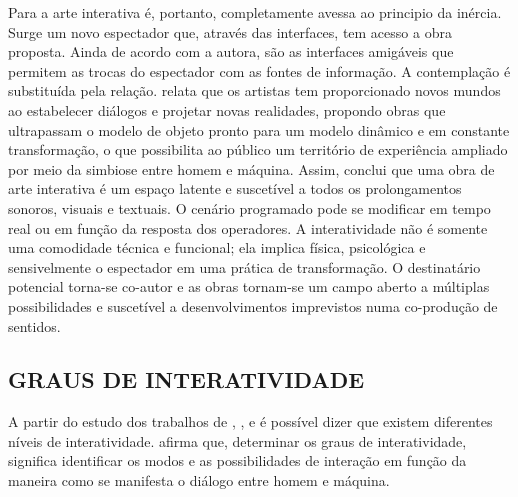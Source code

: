 Para  a arte interativa é, portanto, completamente avessa ao principio da inércia. Surge um novo espectador que, através das interfaces, tem acesso a obra proposta. Ainda de acordo com a autora, são as interfaces amigáveis que permitem as trocas do espectador com as fontes de informação. A contemplação é substituída pela relação.  relata que os artistas tem proporcionado novos mundos ao estabelecer diálogos e projetar novas realidades, propondo obras que ultrapassam o modelo de objeto pronto para um modelo dinâmico e em constante transformação, o que possibilita ao público um território de experiência ampliado por meio da simbiose entre homem e máquina. Assim,  conclui que uma obra de arte interativa é um espaço latente e suscetível a todos os prolongamentos sonoros, visuais e textuais. O cenário programado pode se modificar em tempo real ou em função da resposta dos operadores. A interatividade não é somente uma comodidade técnica e funcional; ela implica física, psicológica e sensivelmente o espectador em uma prática de transformação. O destinatário potencial torna-se co-autor e as obras tornam-se um campo aberto a múltiplas possibilidades e suscetível a desenvolvimentos imprevistos numa co-produção de sentidos.


\subsection{GRAUS DE INTERATIVIDADE}

A partir do estudo dos trabalhos de , ,  e  é possível dizer que existem diferentes níveis de interatividade.  afirma que, determinar os graus de interatividade, significa identificar os modos e as possibilidades de interação em função da maneira como se manifesta o diálogo entre homem e máquina. 

